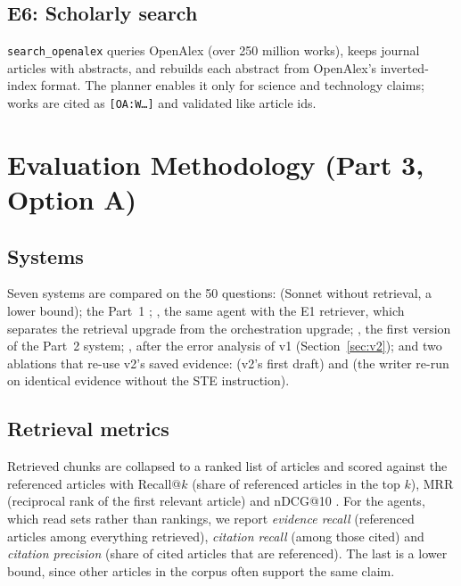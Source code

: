 \subsection{E6: Scholarly search}
\texttt{search\_openalex} queries OpenAlex (over 250 million works), keeps journal articles with abstracts,
and rebuilds each abstract from OpenAlex's inverted-index format. The planner enables it only for science
and technology claims; works are cited as \texttt{[OA:W\ldots]} and validated like article ids.

\section{Evaluation Methodology (Part 3, Option A)}
\subsection{Systems}
Seven systems are compared on the 50 questions:  (Sonnet without retrieval, a lower
bound); the Part~1 ; , the same agent with the E1 retriever, which
separates the retrieval upgrade from the orchestration upgrade; , the first version of the
Part~2 system; , after the error analysis of v1 (Section~\ref{sec:v2}); and two ablations that
re-use v2's saved evidence:  (v2's first draft) and  (the writer re-run on
identical evidence without the STE instruction).

\subsection{Retrieval metrics}
Retrieved chunks are collapsed to a ranked list of articles and scored against the referenced articles
with Recall@$k$ (share of referenced articles in the top $k$), MRR (reciprocal rank of the first relevant
article) and nDCG@10 \cite{jarvelin2002ndcg}. For the agents, which read sets rather than rankings, we report
\emph{evidence recall} (referenced articles among everything retrieved), \emph{citation recall} (among
those cited) and \emph{citation precision} (share of cited articles that are referenced). The last is a lower
bound, since other articles in the corpus often support the same claim.

